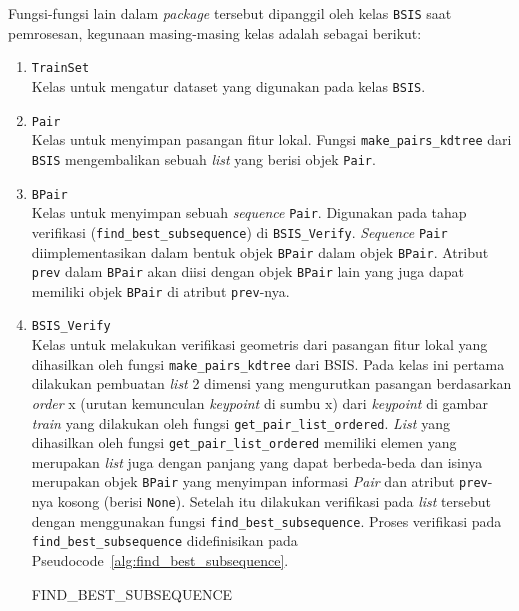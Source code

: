 Fungsi-fungsi lain dalam \textit{package} tersebut dipanggil oleh kelas \texttt{BSIS} saat pemrosesan, kegunaan masing-masing kelas adalah sebagai berikut:
\begin{enumerate}
	\item \texttt{TrainSet} \\
	Kelas untuk mengatur dataset yang digunakan pada kelas \texttt{BSIS}.
	\item \texttt{Pair} \\
	Kelas untuk menyimpan pasangan fitur lokal. Fungsi \texttt{make\_pairs\_kdtree} dari \texttt{BSIS} mengembalikan sebuah \textit{list} yang berisi objek \texttt{Pair}.
	\item \texttt{BPair} \\
	Kelas untuk menyimpan sebuah \textit{sequence} \texttt{Pair}. Digunakan pada tahap verifikasi (\texttt{find\_best\_subsequence}) di \texttt{BSIS\_Verify}. \textit{Sequence} \texttt{Pair} diimplementasikan dalam bentuk objek \texttt{BPair} dalam objek \texttt{BPair}. Atribut \texttt{prev} dalam \texttt{BPair} akan diisi dengan objek \texttt{BPair} lain yang juga dapat memiliki objek \texttt{BPair} di atribut \texttt{prev}-nya. 
	\item \texttt{BSIS\_Verify} \\
	Kelas untuk melakukan verifikasi geometris dari pasangan fitur lokal yang dihasilkan oleh fungsi \texttt{make\_pairs\_kdtree} dari BSIS. Pada kelas ini pertama dilakukan pembuatan \textit{list} 2 dimensi yang mengurutkan pasangan berdasarkan \textit{order} x (urutan kemunculan \textit{keypoint} di sumbu x) dari \textit{keypoint} di gambar \textit{train} yang dilakukan oleh fungsi \texttt{get\_pair\_list\_ordered}. \textit{List} yang dihasilkan oleh fungsi \texttt{get\_pair\_list\_ordered} memiliki elemen yang merupakan \textit{list} juga dengan panjang yang dapat berbeda-beda dan isinya merupakan objek \texttt{BPair} yang menyimpan informasi \textit{Pair} dan atribut \texttt{prev}-nya kosong (berisi \texttt{None}). Setelah itu dilakukan verifikasi pada \textit{list} tersebut dengan menggunakan fungsi \texttt{find\_best\_subsequence}. Proses verifikasi pada \texttt{find\_best\_subsequence} didefinisikan pada Pseudocode~\ref{alg:find_best_subsequence}. \\
	\begin{algorithm}[H]
		\caption{FIND\_BEST\_SUBSEQUENCE}
		\label{alg:find_best_subsequence}
\end{algorithm}
\end{enumerate}
